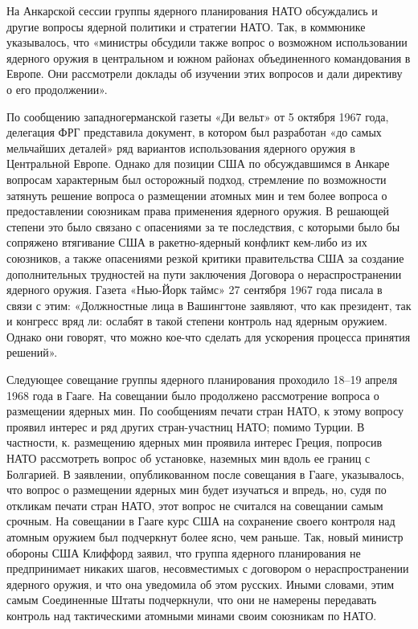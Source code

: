 \documentclass[12pt, a4paper, openany]{book}
\begin{document}
	На Анкарской сессии группы ядерного планирования НАТО обсуждались и другие вопросы ядерной политики и стратегии НАТО. Так, в коммюнике указывалось, что «министры обсудили также вопрос о возможном использовании ядерного оружия в центральном и южном районах объединенного командования в Европе. Они рассмотрели доклады об изучении этих вопросов и дали директиву о его продолжении».
	
	По сообщению западногерманской газеты «Ди вельт» от 5 октября 1967 года, делегация ФРГ представила документ, в котором был разработан «до самых мельчайших деталей» ряд вариантов использования ядерного оружия в Центральной Европе. Однако для позиции США по обсуждавшимся в Анкаре вопросам характерным был осторожный подход, стремление по возможности затянуть решение вопроса о размещении атомных мин и тем более вопроса о предоставлении союзникам права применения ядерного оружия. В решающей степени это было связано с опасениями за те последствия, с которыми было бы сопряжено втягивание США в ракетно-ядерный конфликт кем-либо из их союзников, а также опасениями резкой критики правительства США за создание дополнительных трудностей на пути заключения Договора о нераспространении ядерного оружия. Газета «Нью-Йорк таймс» 27 сентября 1967 года писала в связи с этим: «Должностные лица в Вашингтоне заявляют, что как президент, так и конгресс вряд ли: ослабят в такой степени контроль над ядерным оружием. Однако они говорят, что можно кое-что сделать для ускорения процесса принятия решений».
	
	Следующее совещание группы ядерного планирования проходило 18–19 апреля 1968 года в Гааге. На совещании было продолжено рассмотрение вопроса о размещении ядерных мин. По сообщениям печати стран НАТО, к этому вопросу проявил интерес и ряд других стран-участниц НАТО; помимо Турции. В частности, к. размещению ядерных мин проявила интерес Греция, попросив НАТО рассмотреть вопрос об установке, наземных мин вдоль ее границ с Болгарией. В заявлении, опубликованном после совещания в Гааге, указывалось, что вопрос о размещении ядерных мин будет изучаться и впредь, но, судя по откликам печати стран НАТО, этот вопрос не считался на совещании самым срочным. На совещании в Гааге курс США на сохранение своего контроля над атомным оружием был подчеркнут более ясно, чем раньше. Так, новый министр обороны США Клиффорд заявил, что группа ядерного планирования не предпринимает никаких шагов, несовместимых с договором о нераспространении ядерного оружия, и что она уведомила об этом русских. Иными словами, этим самым Соединенные Штаты подчеркнули, что они не намерены передавать контроль над тактическими атомными минами своим союзникам по НАТО.
	
\end{document}
